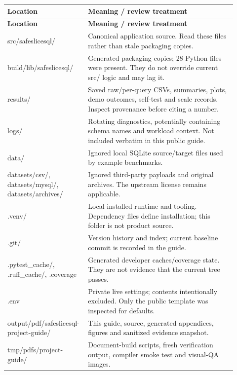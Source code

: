 \begin{longtable}{>{\raggedright\arraybackslash}p{0.285\linewidth}>{\raggedright\arraybackslash}p{0.635\linewidth}}
\toprule
\textbf{Location} & \textbf{Meaning / review treatment} \\
\midrule
\endfirsthead
\toprule
\textbf{Location} & \textbf{Meaning / review treatment} \\
\midrule
\endhead
src/safeslicesql/ & Canonical application source. Read these files rather than stale packaging copies. \\[4pt]
build/lib/safeslicesql/ & Generated packaging copies; 28 Python files were present. They do not override current src/ logic and may lag it. \\[4pt]
results/ & Saved raw/per-query CSVs, summaries, plots, demo outcomes, self-test and scale records. Inspect provenance before citing a number. \\[4pt]
logs/ & Rotating diagnostics, potentially containing schema names and workload context. Not included verbatim in this public guide. \\[4pt]
data/ & Ignored local SQLite source/target files used by example benchmarks. \\[4pt]
datasets/csv/, datasets/mysql/, datasets/archives/ & Ignored third-party payloads and original archives. The upstream license remains applicable. \\[4pt]
.venv/ & Local installed runtime and tooling. Dependency files define installation; this folder is not product source. \\[4pt]
.git/ & Version history and index; current baseline commit is recorded in the guide. \\[4pt]
.pytest\_cache/, .ruff\_cache/, .coverage & Generated developer caches/coverage state. They are not evidence that the current tree passes. \\[4pt]
.env & Private live settings; contents intentionally excluded. Only the public template was inspected for defaults. \\[4pt]
output/pdf/safeslicesql-project-guide/ & This guide, source, generated appendices, figures and sanitized evidence snapshot. \\[4pt]
tmp/pdfs/project-guide/ & Document-build scripts, fresh verification output, compiler smoke test and visual-QA images. \\[4pt]
\bottomrule
\end{longtable}

